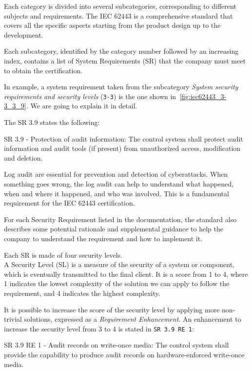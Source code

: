 Each category is divided into several subcategories, corresponding to different subjects and requirements. The IEC 62443 is a comprehensive standard that covers all the specific aspects starting from the product design up to the development.

Each subcategory, identified by the category number followed by an increasing index, contains a list of System Requirements (SR) that the company must meet to obtain the certification. 

In example, a system requirement taken from the subcategory \textit{System security requirements and security levels} (\texttt{3-3}) is the one shown in~\cref{fig:iec62443_3-3_3_9}. We are going to explain it in detail.

The SR 3.9 states the following:
\begin{mdframed}
  SR 3.9 - Protection of audit information: The control system shall protect audit information and audit tools (if present) from unauthorized access, modification and deletion.
\end{mdframed}\label{sr:3-3_3-9}

Log audit are essential for prevention and detection of cyberattacks. When something goes wrong, the log audit can help to understand what happened, when and where it happened, and who was involved. This is a fundamental requirement for the IEC 62443 certification.

For each Security Requirement listed in the documentation, the standard also describes some potential rationale and supplemental guidance to help the company to understand the requirement and how to implement it.

Each SR is made of four security levels. \\
A Security Level (SL) is a measure of the security of a system or component, which is eventually transmitted to the final client. It is a score from 1 to 4, where 1 indicates the lowest complexity of the solution we can apply to follow the requirement, and 4 indicates the highest complexity.~\cite{ixon-practical-guide-iec-62443}

It is possible to increase the score of the security level by applying more non-trivial solutions, expressed as a \textit{Requirement Enhancement}. An enhancement to increase the security level from 3 to 4 is stated in \texttt{SR 3.9 RE 1}:
\begin{mdframed}
  SR 3.9 RE 1 - Audit records on write-once media: The control system shall provide the capability to produce audit records on hardware-enforced write-once media.
\end{mdframed}\label{sr:3-3_3-9_re1}

